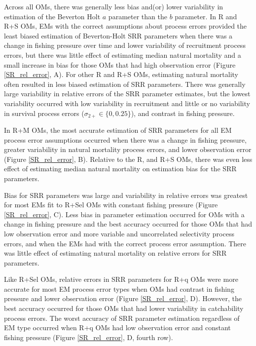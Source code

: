 \documentclass[
  12pt,
]{article}
\begin{document}
Across all OMs, there was generally less bias and(or) lower variability
in estimation of the Beverton Holt \(a\) parameter than the \(b\)
parameter. In R and R+S OMs, EMs with the correct assumptions about
process errors provided the least biased estimation of Beverton-Holt SRR
parameters when there was a change in fishing pressure over time and
lower variability of recruitment process errors, but there was little
effect of estimating median natural mortality and a small increase in
bias for those OMs that had high observation error (Figure
\ref{SR_rel_error}, A). For other R and R+S OMs, estimating natural
mortality often resulted in less biased estimation of SRR parameters.
There was generally large variability in relative errors of the SRR
parameter estimates, but the lowest variability occurred with low
variability in recruitment and little or no variability in survival
process errors (\(\sigma_{2+} \in \{0,0.25\}\)), and contrast in fishing
pressure.

In R+M OMs, the most accurate estimation of SRR parameters for all EM
process error assumptions occurred when there was a change in fishing
pressure, greater variability in natural mortality process errors, and
lower observation error (Figure \ref{SR_rel_error}, B). Relative to the
R, and R+S OMs, there was even less effect of estimating median natural
mortality on estimation bias for the SRR parameters.

Bias for SRR parameters was large and variability in relative errors was
greatest for most EMs fit to R+Sel OMs with constant fishing pressure
(Figure \ref{SR_rel_error}, C). Less bias in parameter estimation
occurred for OMs with a change in fishing pressure and the best accuracy
occurred for those OMs that had low observation error and more variable
and uncorrelated selectivity process errors, and when the EMs had with
the correct process error assumption. There was little effect of
estimating natural mortality on relative errors for SRR parameters.

Like R+Sel OMs, relative errors in SRR parameters for R+q OMs were more
accurate for most EM process error types when OMs had contrast in
fishing pressure and lower observation error (Figure \ref{SR_rel_error},
D). However, the best accuracy occurred for those OMs that had lower
variability in catchability process errors. The worst accuracy of SRR
parameter estimation regardless of EM type occurred when R+q OMs had low
observation error and constant fishing pressure (Figure
\ref{SR_rel_error}, D, fourth row).
\end{document}
